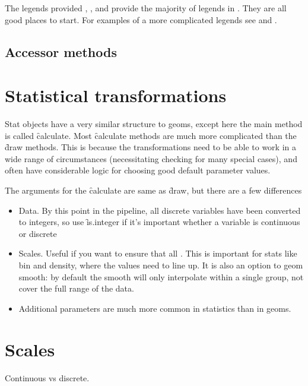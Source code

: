 The legends provided , , and  provide the majority of legends in \ggplot.  They are all good places to start.  For examples of a more complicated legends see  and .

\subsection{Accessor methods}



\section{Statistical transformations}
\label{sec:own-stat}

Stat objects have a very similar structure to geoms, except here the main method is called \f{calculate}.  Most \f{calculate} methods are much more complicated than the \f{draw} methods.  This is because the transformations need to be able to work in a wide range of circumstances (necessitating checking for many special cases), and often have considerable logic for choosing good default parameter values.

The arguments for the \f{calculate} are same as \f{draw}, but there are a few differences

\begin{itemize}
  \item Data. By this point in the pipeline, all discrete variables have been converted to integers, so use \f{is.integer} if it's important whether a variable is continuous or discrete
  
  \item Scales.  Useful if you want to ensure that all .  This is important for stats like bin and density, where the values need to line up.  It is also an option to geom smooth: by default the smooth will only interpolate within a single group, not cover the full range of the data.

  \item Additional parameters are much more common in statistics than in geoms.
\end{itemize}

\section{Scales}
\label{sec:own-scale}

Continuous vs discrete.  

